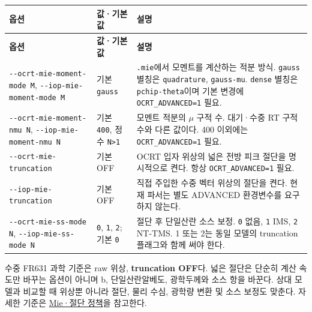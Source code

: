 {\TableFont
\begin{longtable}{@{}>{\raggedright\arraybackslash}p{}>{\raggedright\arraybackslash}p{}>{\raggedright\arraybackslash}p{}@{}}
\toprule
\textbf{옵션} & \textbf{값·기본값} & \textbf{설명} \\
\midrule
\endfirsthead
\toprule
\textbf{옵션} & \textbf{값·기본값} & \textbf{설명} \\
\midrule
\endhead
\bottomrule
\endfoot
\texttt{-\allowbreak{}-\allowbreak{}ocrt-\allowbreak{}mie-\allowbreak{}moment-\allowbreak{}mode M}, \texttt{-\allowbreak{}-\allowbreak{}iop-\allowbreak{}mie-\allowbreak{}moment-\allowbreak{}mode M} & 기본 \texttt{gauss} & \texttt{.\allowbreak{}mie}에서 모멘트를 계산하는 적분 방식. \texttt{gauss} 별칭은 \texttt{quadrature}, \texttt{gauss-\allowbreak{}mu}. \texttt{dense} 별칭은 \texttt{pchip-\allowbreak{}theta}이며 기본 변경에 \texttt{OCRT\_\allowbreak{}ADVANCED=\allowbreak{}1} 필요. \\
\texttt{-\allowbreak{}-\allowbreak{}ocrt-\allowbreak{}mie-\allowbreak{}moment-\allowbreak{}nmu N}, \texttt{-\allowbreak{}-\allowbreak{}iop-\allowbreak{}mie-\allowbreak{}moment-\allowbreak{}nmu N} & 기본 \texttt{400}, 정수 \texttt{N>1} & 모멘트 적분의 \ensuremath{\mu} 구적 수. 대기·수중 RT 구적 수와 다른 값이다. 400 이외에는 \texttt{OCRT\_\allowbreak{}ADVANCED=\allowbreak{}1} 필요. \\
\texttt{-\allowbreak{}-\allowbreak{}ocrt-\allowbreak{}mie-\allowbreak{}truncation} & 기본 OFF & OCRT 입자 위상의 넓은 전방 피크 절단을 명시적으로 켠다. 항상 \texttt{OCRT\_\allowbreak{}ADVANCED=\allowbreak{}1} 필요. \\
\texttt{-\allowbreak{}-\allowbreak{}iop-\allowbreak{}mie-\allowbreak{}truncation} & 기본 OFF & 직접 주입한 수중 벡터 위상의 절단을 켠다. 현재 파서는 별도 ADVANCED 환경변수를 요구하지 않는다. \\
\texttt{-\allowbreak{}-\allowbreak{}ocrt-\allowbreak{}mie-\allowbreak{}ss-\allowbreak{}mode N}, \texttt{-\allowbreak{}-\allowbreak{}iop-\allowbreak{}mie-\allowbreak{}ss-\allowbreak{}mode N} & \texttt{0}, \texttt{1}, \texttt{2}; 기본 \texttt{0} & 절단 후 단일산란 소스 보정. \texttt{0} 없음, \texttt{1} IMS, \texttt{2} NT-TMS. 1 또는 2는 동일 모델의 truncation 플래그와 함께 써야 한다. \\
\end{longtable}
}

수중 FR631 과학 기준은 raw 위상, \textbf{truncation OFF}다. 넓은 절단은 단순히 계산 속도만 바꾸는 옵션이 아니며 b, 단일산란알베도, 광학두께와 소스 항을 바꾼다. 상대 모델과 비교할 때 위상뿐 아니라 절단, 물리 수심, 광학량 변환 및 소스 보정도 맞춘다. 자세한 기준은 \href{https://github.com/brtnt/OCRT/blob/54861c68e35ec5aaa3938fad53e93dc2dfa7eb1d/code/OCRT_C/docs/OCRT_MIE_GRID_TRUNCATION_AND_VALIDATION_ARTIFACT_POLICY_2026-08-21.md}{Mie·절단 정책}을 참고한다.

